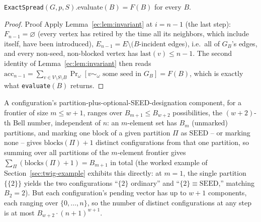 \documentclass[ijoc,sglanonrev]{informs4}
\newcommand{\FF}{F}
\begin{document}
\begin{repeattheorem}
\texttt{ExactSpread}$(G,p,S)$.evaluate$(B)=\FF(B)$ for every $B$.
\end{repeattheorem}
\begin{proof}{Proof}
Apply Lemma~\ref{ec:lem:invariant} at $i=n-1$ (the last step): $F_{n-1}
=\varnothing$ (every vertex has retired by the time all its neighbors,
which include itself, have been introduced), $E_{n-1}=E\setminus(B$-incident
edges$)$, i.e.\ all of $G_B$'s edges, and every non-seed, non-blocked
vertex has $\mathrm{last}(v)\le n-1$. The second identity of
Lemma~\ref{ec:lem:invariant} then reads $\mathrm{acc}_{n-1}=
\sum_{v\in V\setminus S\setminus B}\Pr_\omega[v\sim_\omega\text{ some seed
in }G_B]=\FF(B)$, which is exactly what \texttt{evaluate}$(B)$
returns.\Halmos
\end{proof}

\begin{repeatproposition}
A configuration's partition-plus-optional-SEED-designation component,
for a frontier of size $m\le w+1$, ranges over $B_{m+1}\le B_{w+2}$
possibilities, the $(w+2)$-th Bell number, independent of $n$: an
$m$-element set has $B_m$ (unmarked) partitions, and marking one block of a
given partition $\Pi$ as $\mathrm{SEED}$ -- or marking none -- gives
$\mathrm{blocks}(\Pi)+1$ distinct configurations from that one partition, so
summing over all partitions of the $m$-element frontier gives
$\sum_\Pi(\mathrm{blocks}(\Pi)+1)=B_{m+1}$ in total (the worked example of
Section~\ref{sec:twig-example} exhibits this directly: at $m=1$, the single
partition $\{\{2\}\}$ yields the two configurations ``$\{2\}$ ordinary'' and
``$\{2\}\equiv\mathrm{SEED}$,'' matching $B_2=2$). But each configuration's
pending vector has up to $w+1$ components, each ranging over
$\{0,\dots,n\}$, so the number of distinct configurations at any step is at
most $B_{w+2}\cdot(n+1)^{w+1}$.
\end{repeatproposition}
\end{document}
